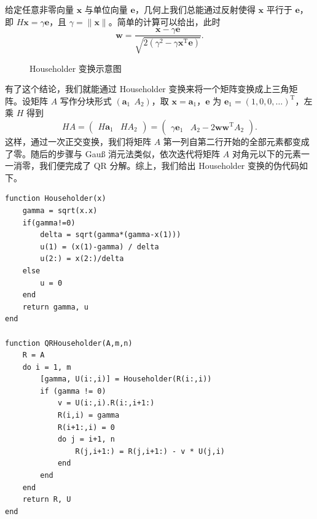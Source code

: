 给定任意非零向量 $\bm x$ 与单位向量 $\bm e$，几何上我们总能通过反射使得 $\bm x$ 平行于 $\bm e$，即 $H\bm x=\gamma\bm e$，且 $\gamma=\lVert\bm x\rVert$。简单的计算可以给出，此时
\begin{equation}
\bm w=\frac{\bm x-\gamma\bm e}{\sqrt{2(\gamma^2-\gamma\bm x^{\mathrm T}\bm e)}}.
\tag{3.3.10}
\end{equation}

\begin{figure}[htbp]
\centering
{}
\caption{Householder 变换示意图}
\label{fig:householder-reflection}
\end{figure}

有了这个结论，我们就能通过 Householder 变换来将一个矩阵变换成上三角矩阵。设矩阵 $A$ 写作分块形式 $(\bm a_1\ \ A_2)$，取 $\bm x=\bm a_1$，$\bm e$ 为 $\bm e_1=(1,0,0,\ldots)^{\mathrm T}$，左乘 $H$ 得到
\begin{equation}
HA=\begin{pmatrix}H\bm a_1&HA_2\end{pmatrix}
=\begin{pmatrix}\gamma\bm e_1&A_2-2\bm w\bm w^{\mathrm T}A_2\end{pmatrix}.
\tag{3.3.11}
\end{equation}
这样，通过一次正交变换，我们将矩阵 $A$ 第一列自第二行开始的全部元素都变成了零。随后的步骤与 Gauß 消元法类似，依次迭代将矩阵 $A$ 对角元以下的元素一一消零，我们便完成了 QR 分解。综上，我们给出 Householder 变换的伪代码如下。

\begin{algorithmBox}
\begin{lstlisting}[style=bellacode]
function Householder(x)
    gamma = sqrt(x.x)
    if(gamma!=0)
        delta = sqrt(gamma*(gamma-x(1)))
        u(1) = (x(1)-gamma) / delta
        u(2:) = x(2:)/delta
    else
        u = 0
    end
    return gamma, u
end

function QRHouseholder(A,m,n)
    R = A
    do i = 1, m
        [gamma, U(i:,i)] = Householder(R(i:,i))
        if (gamma != 0)
            v = U(i:,i).R(i:,i+1:)
            R(i,i) = gamma
            R(i+1:,i) = 0
            do j = i+1, n
                R(j,i+1:) = R(j,i+1:) - v * U(j,i)
            end
        end
    end
    return R, U
end
\end{lstlisting}
\end{algorithmBox}

